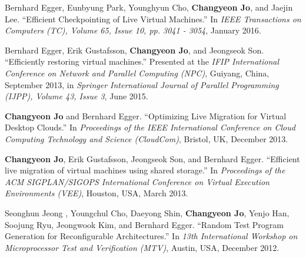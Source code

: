 \documentclass[margin]{res}
\begin{document}
\begin{resume}
\vspace{-0.5em}
\par
Bernhard Egger, Eunbyung Park, Younghyun Cho, \textbf{Changyeon Jo}, and Jaejin Lee. ``Efficient Checkpointing of Live Virtual Machines.'' In \textit{IEEE Transactions on Computers (TC), Volume 65, Issue 10, pp. 3041 - 3054}, January 2016.

\par
Bernhard Egger, Erik Gustafsson, \textbf{Changyeon Jo}, and Jeongseok Son. ``Efficiently restoring virtual machines.'' Presented at the \textit{IFIP International Conference on Network and Parallel Computing (NPC)}, Guiyang, China, September 2013, in \textit{Springer International Journal of Parallel Programming (IJPP), Volume 43, Issue 3}, June 2015.

\vspace{-0.5em}
\par
\textbf{Changyeon Jo} and Bernhard Egger. ``Optimizing Live Migration for Virtual Desktop Clouds.'' In \textit{Proceedings of the IEEE International Conference on Cloud Computing Technology and Science (CloudCom)}, Bristol, UK, December 2013.

\newpage

\par
\vspace{-1.0em}
\textbf{Changyeon Jo}, Erik Gustafsson, Jeongseok Son, and Bernhard Egger. ``Efficient live migration of virtual machines using shared storage.'' In \textit{Proceedings of the ACM SIGPLAN/SIGOPS International Conference on Virtual Execution Environments (VEE)}, Houston, USA, March 2013.

\vspace{-0.5em}
\par
Seonghun Jeong , Youngchul Cho, Daeyong Shin, \textbf{Changyeon Jo}, Yenjo Han, Soojung Ryu, Jeongwook Kim, and Bernhard Egger. ``Random Test Program Generation for Reconfigurable Architectures.'' In \textit{13th International Workshop on Microprocessor Test and Verification (MTV)}, Austin, USA, December 2012.



\end{resume}
\end{document}
